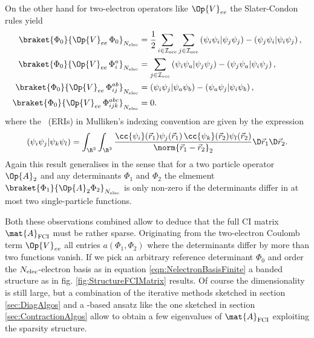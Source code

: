 \begin{rem}
	\noindent
	On the other hand for
	two-electron operators like $\Op{V}_{ee}$
	the Slater-Condon rules yield
	\begin{equation}
	\begin{aligned}
		\braket{\Phi_0}{\Op{V}_{ee}\, \Phi_0}_{\Nelec}
		&= \frac12 \sum_{i\in\Iocc} \sum_{j\in\Iocc}
			  \eriMu{\psi_i\psi_i}{\psi_j\psi_j}
			- \eriMu{\psi_j\psi_i}{\psi_i\psi_j}, \\
		\braket{\Phi_0}{\Op{V}_{ee}\, \Phi_i^a}_{\Nelec}
		&= \sum_{j\in\Iocc}
			  \eriMu{\psi_i\psi_a}{\psi_j\psi_j}
			- \eriMu{\psi_j\psi_a}{\psi_i\psi_j}, \\
		\braket{\Phi_0}{\Op{V}_{ee}\, \Phi_{ij}^{ab}}_{\Nelec}
		&= \eriMu{\psi_i\psi_j}{\psi_a\psi_b}
		 - \eriMu{\psi_a\psi_j}{\psi_i\psi_b}, \\
		\braket{\Phi_0}{\Op{V}_{ee}\, \Phi_{ijk}^{abc}}_{\Nelec} &= 0.
	\end{aligned}
		\label{eqn:SlaterCondonCoulomb}
	\end{equation}
	where the ~(ERIs)
	in Mulliken's indexing convention are given by the expression
	\begin{equation}
		\eriMu{\psi_i \psi_j}{\psi_k \psi_l}
			= \int_{\R^3} \int_{\R^3}
				\frac{\cc{\psi_i}(\vec{r}_1) \psi_j(\vec{r}_1)
					\,\cc{\psi_k}(\vec{r}_2) \psi_l(\vec{r}_2)}
				{\norm{\vec{r}_1 - \vec{r}_2}_2}
				\D \vec{r}_1 \D \vec{r}_2.
		\label{eqn:ERI}
	\end{equation}
	Again this result generalises in the sense
	that for a two particle operator $\Op{A}_2$
	and any determinants $\Phi_1$ and $\Phi_2$
	the elmement $\braket{\Phi_1}{\Op{A}_2 \Phi_2}_{\Nelec}$
	is only non-zero if the determinants
	differ in at most two single-particle functions.

	Both these observations combined allow to deduce
	that the full CI matrix $\mat{A}_\text{FCI}$ must be rather sparse.
	Originating from the two-electron Coulomb term $\Op{V}_{ee}$
	all entries $a(\Phi_1, \Phi_2)$ where the determinants
	differ by more than two functions vanish.
	If we pick an arbitrary reference determinant $\Phi_0$
	and order the $N_\text{elec}$-electron basis as in equation \eqref{eqn:NelectronBasisFinite}
	a banded structure as in fig. \vref{fig:StructureFCIMatrix} results.
	Of course the dimensionality is still large,
	but a combination of the iterative methods sketched
	in section \vref{sec:DiagAlgos}
	and a \contraction-based ansatz like the one sketched in section \vref{sec:ContractionAlgos}
	allow to obtain a few eigenvalues of $\mat{A}_\text{FCI}$
	exploiting the sparsity structure.
\end{rem}
